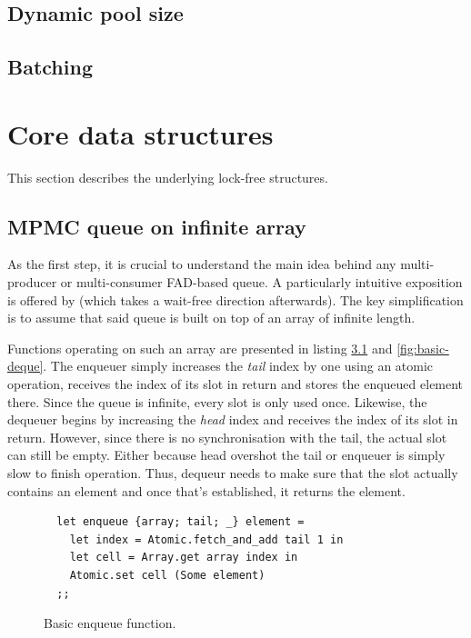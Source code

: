 \documentclass[12pt,a4paper,twoside]{report}
\begin{document}
\section{Dynamic pool size}
\section{Batching}




\chapter{Core data structures}
\label{section:underlying_data_structures}

This section describes the underlying lock-free structures. 

\section{MPMC queue on infinite array}
\label{section:mpmc_queue_on_inf}
As the first step, it is crucial to understand the main idea behind any multi-producer or multi-consumer FAD-based queue. A particularly intuitive exposition is offered by \cite{Yang2016} (which takes a wait-free direction afterwards). The key simplification is to assume that said queue is built on top of an array of infinite length. 

Functions operating on such an array are presented in listing \ref{fig:basic-enqueue} and \ref{fig:basic-deque}. The enqueuer simply increases the \textit{tail} index by one using an atomic operation, receives the index of its slot in return and stores the enqueued element there. Since the queue is infinite, every slot is only used once. Likewise, the dequeuer begins by increasing the \textit{head} index and receives the index of its slot in return. However, since there is no synchronisation with the tail, the actual slot can still be empty. Either because head overshot the tail or enqueuer is simply slow to finish operation. Thus, dequeur needs to make sure that the slot actually contains an element and once that's established, it returns the element. 

\begin{figure}
    \centering
    \begin{verbatim}
  let enqueue {array; tail; _} element = 
    let index = Atomic.fetch_and_add tail 1 in
    let cell = Array.get array index in 
    Atomic.set cell (Some element)
  ;;
    \end{verbatim}
    \caption{Basic enqueue function.}
    \label{fig:basic-enqueue}
\end{figure}
\end{document}

